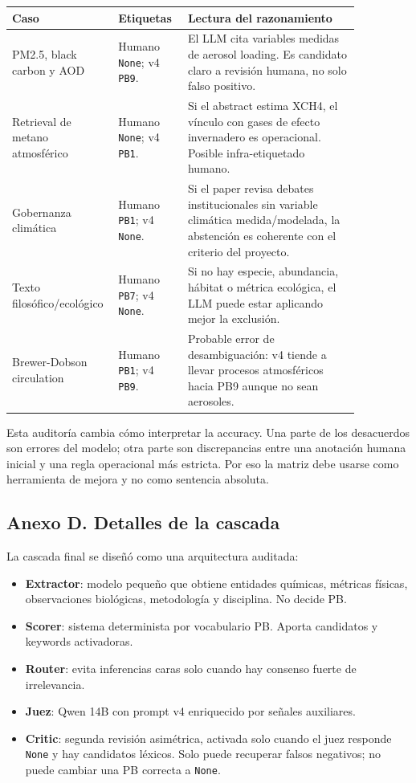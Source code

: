\begin{center}
\scriptsize
\setlength{\tabcolsep}{4pt}
\renewcommand{\arraystretch}{1.15}
\begin{tabular}{p{0.20\linewidth}p{0.19\linewidth}p{0.47\linewidth}}
\toprule
Caso & Etiquetas & Lectura del razonamiento \\
\midrule
PM2.5, black carbon y AOD & Humano \texttt{None}; v4 \texttt{PB9}. & El LLM cita variables medidas de aerosol loading. Es candidato claro a revisión humana, no solo falso positivo. \\
Retrieval de metano atmosférico & Humano \texttt{None}; v4 \texttt{PB1}. & Si el abstract estima XCH4, el vínculo con gases de efecto invernadero es operacional. Posible infra-etiquetado humano. \\
Gobernanza climática & Humano \texttt{PB1}; v4 \texttt{None}. & Si el paper revisa debates institucionales sin variable climática medida/modelada, la abstención es coherente con el criterio del proyecto. \\
Texto filosófico/ecológico & Humano \texttt{PB7}; v4 \texttt{None}. & Si no hay especie, abundancia, hábitat o métrica ecológica, el LLM puede estar aplicando mejor la exclusión. \\
Brewer-Dobson circulation & Humano \texttt{PB1}; v4 \texttt{PB9}. & Probable error de desambiguación: v4 tiende a llevar procesos atmosféricos hacia PB9 aunque no sean aerosoles. \\
\bottomrule
\end{tabular}
\end{center}

Esta auditoría cambia cómo interpretar la accuracy. Una parte de los desacuerdos son errores del modelo; otra parte son discrepancias entre una anotación humana inicial y una regla operacional más estricta. Por eso la matriz debe usarse como herramienta de mejora y no como sentencia absoluta.

\subsection*{Anexo D. Detalles de la cascada}

La cascada final se diseñó como una arquitectura auditada:

\begin{itemize}
\item \textbf{Extractor}: modelo pequeño que obtiene entidades químicas, métricas físicas, observaciones biológicas, metodología y disciplina. No decide PB.
\item \textbf{Scorer}: sistema determinista por vocabulario PB. Aporta candidatos y keywords activadoras.
\item \textbf{Router}: evita inferencias caras solo cuando hay consenso fuerte de irrelevancia.
\item \textbf{Juez}: Qwen 14B con prompt v4 enriquecido por señales auxiliares.
\item \textbf{Critic}: segunda revisión asimétrica, activada solo cuando el juez responde \texttt{None} y hay candidatos léxicos. Solo puede recuperar falsos negativos; no puede cambiar una PB correcta a \texttt{None}.
\end{itemize}

